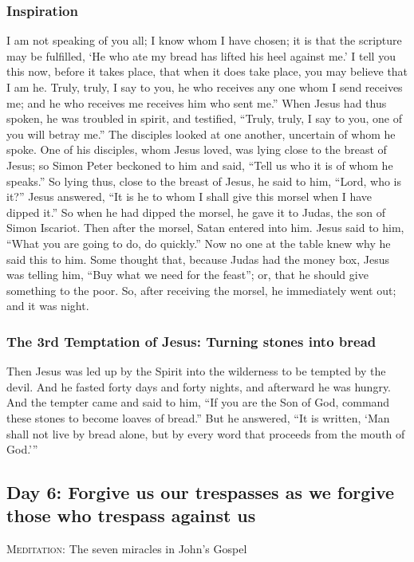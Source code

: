 \subsubsection*{Inspiration}
\begin{multicols}{2}\small
I am not speaking of you all; I know whom I have chosen; it is that the scripture may be fulfilled,
`He who ate my bread has lifted his heel against me.' I tell you this now,
before it takes place, that when it does take place, you may believe that I am he. Truly, truly, I say to you, he who
receives any one whom I send receives me; and he who receives me receives him who sent me.” When Jesus had thus spoken,
he was troubled in spirit, and testified, “Truly, truly, I say to you, one of you will betray me.” The disciples looked
at one another, uncertain of whom he spoke. One of his disciples, whom Jesus loved, was lying close to the breast of
Jesus; so Simon Peter beckoned to him and said, “Tell us who it is of whom he speaks.” So lying thus, close to the
breast of Jesus, he said to him, “Lord, who is it?” Jesus answered, “It is he to whom I shall give this morsel when I
have dipped it.” So when he had dipped the morsel, he gave it to Judas, the son of Simon Iscariot. Then after the
morsel, Satan entered into him. Jesus said to him, “What you are going to do, do quickly.” Now no one at the table knew
why he said this to him. Some thought that, because Judas had the money box, Jesus was telling him, “Buy what we need
for the feast”; or, that he should give something to the poor. So, after receiving the morsel, he immediately went out;
and it was night. 
\end{multicols}

\subsubsection*{The 3rd Temptation of Jesus: Turning stones into bread}
\begin{quotationx}
Then Jesus was led up by the Spirit into the wilderness to be tempted by the devil. And he fasted forty days and forty
nights, and afterward he was hungry. And the tempter came and said to him, “If you are the Son of God, command these
stones to become loaves of bread.” But he answered, “It is written, ‘Man shall not live by bread
alone, but by every word that proceeds from the mouth of God.'” 
\end{quotationx}

\subsection*{Day 6: Forgive us our trespasses as we forgive those who trespass against us}
\textsc{Meditation}: The seven miracles in John's Gospel

